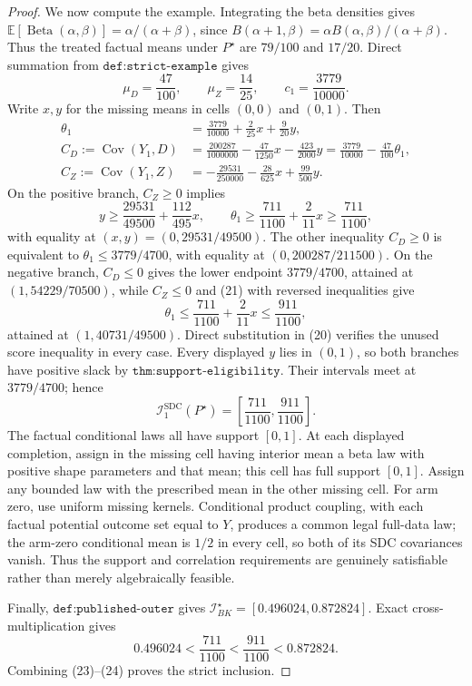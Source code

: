 \documentclass{article}
\begin{document}
\begin{proof}
We now compute the example.  Integrating the beta densities gives \(\mathbb E[\operatorname{Beta}(\alpha,\beta)]=\alpha/(\alpha+\beta)\), since \(B(\alpha+1,\beta)=\alpha B(\alpha,\beta)/(\alpha+\beta)\).  Thus the treated factual means under \(P^\star\) are \(79/100\) and \(17/20\).  Direct summation from \(\texttt{def:strict-example}\) gives
\[
 \mu_D=\frac{47}{100},\qquad
 \mu_Z=\frac{14}{25},\qquad
 c_1=\frac{3779}{10000}.
\]
Write \(x,y\) for the missing means in cells \((0,0)\) and \((0,1)\).  Then
\[
 \begin{aligned}
 \theta_1&=\frac{3779}{10000}+\frac{2}{25}x+\frac{9}{20}y,\\
 C_D:=\operatorname{Cov}(Y_1,D)
 &=\frac{200287}{1000000}-\frac{47}{1250}x-\frac{423}{2000}y
   =\frac{3779}{10000}-\frac{47}{100}\theta_1,\\
 C_Z:=\operatorname{Cov}(Y_1,Z)
 &=-\frac{29531}{250000}-\frac{28}{625}x+\frac{99}{500}y.
 \end{aligned}                                                               \tag{20}
\]
On the positive branch, \(C_Z\ge0\) implies
\[
 y\ge\frac{29531}{49500}+\frac{112}{495}x,
 \qquad
 \theta_1\ge\frac{711}{1100}+\frac{2}{11}x\ge\frac{711}{1100},             \tag{21}
\]
with equality at \((x,y)=(0,29531/49500)\).  The other inequality \(C_D\ge0\) is equivalent to \(\theta_1\le3779/4700\), with equality at \((0,200287/211500)\).  On the negative branch, \(C_D\le0\) gives the lower endpoint \(3779/4700\), attained at \((1,54229/70500)\), while \(C_Z\le0\) and (21) with reversed inequalities give
\[
 \theta_1\le\frac{711}{1100}+\frac{2}{11}x\le\frac{911}{1100},              \tag{22}
\]
attained at \((1,40731/49500)\).  Direct substitution in (20) verifies the unused score inequality in every case.  Every displayed \(y\) lies in \((0,1)\), so both branches have positive slack by \(\texttt{thm:support-eligibility}\).  Their intervals meet at \(3779/4700\); hence
\[
 \mathcal I_1^{\mathrm{SDC}}(P^\star)
 =\left[\frac{711}{1100},\frac{911}{1100}\right].                            \tag{23}
\]
The factual conditional laws all have support \([0,1]\).  At each displayed completion, assign in the missing cell having interior mean a beta law with positive shape parameters and that mean; this cell has full support \([0,1]\).  Assign any bounded law with the prescribed mean in the other missing cell.  For arm zero, use uniform missing kernels.  Conditional product coupling, with each factual potential outcome set equal to \(Y\), produces a common legal full-data law; the arm-zero conditional mean is \(1/2\) in every cell, so both of its SDC covariances vanish.  Thus the support and correlation requirements are genuinely satisfiable rather than merely algebraically feasible.

Finally, \(\texttt{def:published-outer}\) gives \(\mathcal I_{BK}^\star=[0.496024,0.872824]\).  Exact cross-multiplication gives
\[
 0.496024<\frac{711}{1100}<\frac{911}{1100}<0.872824.                          \tag{24}
\]
Combining (23)--(24) proves the strict inclusion.
\end{proof}
\end{document}
